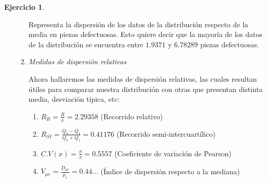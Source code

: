 \documentclass[a4paper, 12pt]{article}
\theoremstyle{definition}
\newtheorem{ej}{Ejercicio}
\begin{document}
\begin{ej}
\begin{enumerate}[label=\textit{\alph*)}]
\begin{enumerate}[label=\arabic*)]
        Representa la dispersión de los datos de la distribución respecto de la media en piezas defectuosas. Esto quiere decir que la mayoría de los datos de la distribución se encuentra entre \(1.9371\) y \(6.78289\) piezas defectuosas.
        
        \item \textit{Medidas de dispersión relativas}
        
        Ahora hallaremos las medidas de dispersión relativas, las cuales resultan útiles para comparar nuestra distribución con otras que presentan distinta media, desviación típica, etc:
        
        \begin{enumerate}[label=]
            \item \(R_R = \frac{R}{\overline{x}} = 2.29358\) (Recorrido relativo)
            \item \(R_{SI} = \frac{Q_3 - Q_1}{Q_3 + Q_1} = 0.41176\) (Recorrido semi-intercuartílico)
            \item \(C.V(x) = \frac{\sigma}{\overline{x}} = 0.5557\) (Coeficiente de variación de Pearson)
            \item \(V_{\mu e} = \frac{D_{\mu e}}{\mu_e} = 0.44\dotsc\) (Índice de dispersión respecto a la mediana)
        \end{enumerate}
    \end{enumerate}
\end{enumerate}

\end{ej} 
\end{document}
